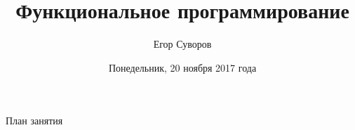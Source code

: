 \documentclass[utf8,xcolor=table]{beamer}
\title{Функциональное программирование}
\author{Егор Суворов}
\institute[СПб АУ]{Курс <<Парадигмы и языки программирования>>, подгруппа 3}
\date[20.11.2017]{Понедельник, 20 ноября 2017 года}
\begin{document}
\begin{frame}
\titlepage
\end{frame}

\begin{frame}{План занятия}
	\tableofcontents
\end{frame}












\end{document}

